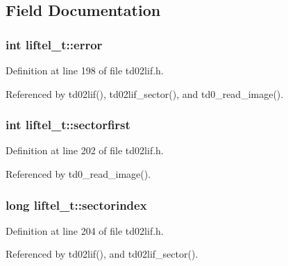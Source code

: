 \subsection{Field Documentation}
\subsubsection[{\texorpdfstring{error}{error}}]{\setlength{\rightskip}{0pt plus 5cm}int liftel\+\_\+t\+::error}\hypertarget{structliftel__t_abc69ee3835be72037c41a11b7457cecd}{}\label{structliftel__t_abc69ee3835be72037c41a11b7457cecd}


Definition at line 198 of file td02lif.\+h.



Referenced by td02lif(), td02lif\+\_\+sector(), and td0\+\_\+read\+\_\+image().

\subsubsection[{\texorpdfstring{sectorfirst}{sectorfirst}}]{\setlength{\rightskip}{0pt plus 5cm}int liftel\+\_\+t\+::sectorfirst}\hypertarget{structliftel__t_a28dddd09745822ae834b073ad3c3bd98}{}\label{structliftel__t_a28dddd09745822ae834b073ad3c3bd98}


Definition at line 202 of file td02lif.\+h.



Referenced by td0\+\_\+read\+\_\+image().

\subsubsection[{\texorpdfstring{sectorindex}{sectorindex}}]{\setlength{\rightskip}{0pt plus 5cm}long liftel\+\_\+t\+::sectorindex}\hypertarget{structliftel__t_a13e9f8b2e23d8f028f456d4465beb4d5}{}\label{structliftel__t_a13e9f8b2e23d8f028f456d4465beb4d5}


Definition at line 204 of file td02lif.\+h.



Referenced by td02lif(), and td02lif\+\_\+sector().

